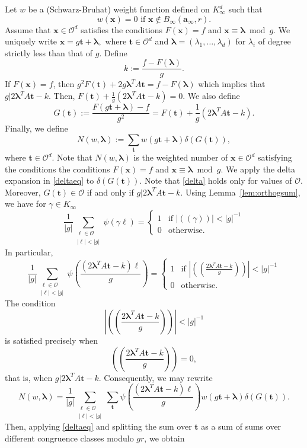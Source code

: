 \documentclass[11pt]{amsart}
\theoremstyle{plain}
\theoremstyle{plain}
\renewcommand{\vec}[1]{\mathbf{#1}}
\theoremstyle{remark}
\theoremstyle{definition}
\newcommand{\Ki}{K_\infty}
\newcommand{\cO}{\mathcal{O}}
\begin{document}
Let $w$ be a (Schwarz-Bruhat) weight function defined on $\Ki^d$ such that 
\begin{equation}\label{property1}  w(\vec{x})=0  \text{ if }   \vec{x}\notin B_{\infty}(\vec{a}_{\infty},r).\end{equation}
Assume that $\vec{x}\in \mathcal{O}^d$ satisfies the conditions $F(\vec{x})=f$ and $\vec{x}\equiv \boldsymbol{\lambda}\bmod g$. We uniquely write $\vec{x}=g\vec{t}+ \boldsymbol{\lambda},$ where $\vec{t}\in  \mathcal{O}^d$ and $\boldsymbol{\lambda}=(\lambda_1,\dots,\lambda_d)$ for $\lambda_i$ of degree strictly less than that of $g$. Define 
\begin{equation}\label{defk}
k:= \frac{f-F(\boldsymbol{\lambda})}{g}.
\end{equation}
If
$F(\vec{x}) =f$, then $g^2F(\vec{t})+2g\boldsymbol{\lambda}^T A\vec{t} =f-F(\boldsymbol{\lambda})$ which implies that $g|2\boldsymbol{\lambda}^TA\vec{t}-k.$ 
 Then, 
$F(\vec{t})+\frac{1}{g}(2\boldsymbol{\lambda}^T A\vec{t}-k )=0.$
We also define 
\[G(\vec{t}):=\frac{F(g\vec{t}+\boldsymbol{\lambda})-f}{g^2}=F(\vec{t})+\frac{1}{g}(2\boldsymbol{\lambda}^T A\vec{t}-k).\]
Finally, we  define $$N(w,\boldsymbol{\lambda}):=\sum_{\vec{t}} w(g\vec{t}+\boldsymbol{\lambda}) \delta{(G(\vec{t}))},$$  where $\vec{t}\in \mathcal{O}^{d}$. Note that $N(w,\boldsymbol{\lambda})$ is the weighted number of $\boldsymbol{x}\in\mathcal{O}^d$ satisfying the conditions the conditions $F(\vec{x})=f$ and $\vec{x}\equiv \boldsymbol{\lambda}\bmod g$. We apply the delta expansion in \eqref{deltaeq} to   $ \delta{(G(\vec{t}))}.$ Note that \eqref{delta} holds only for values of $\mathcal{O}$. Moreover,  $G(\vec{t})\in \mathcal{O}$ if and only if $g|2\boldsymbol{\lambda}^TA\vec{t}-k.$ Using Lemma~\ref{lem:orthogsum}, we have for $\gamma\in\Ki$
\[
\frac{1}{|g|}\sum_{\substack{\ell\in \cO\\ |\ell|<|g|}}\psi(\gamma \ell)=\begin{cases}1 & \mbox{if $|(\!(\gamma)\!)|<|g|^{-1}$}\\ 0 & \mbox{otherwise.}\end{cases}
\]
In particular,
\[
\frac{1}{|g|}\sum_{\substack{\ell\in \cO\\ |\ell|<|g|}}\psi\left(\frac{(2\boldsymbol{\lambda}^T A\vec{t}-k)\ell}{g}\right)=\begin{cases}1 & \mbox{if $|(\!(\frac{2\boldsymbol{\lambda}^T A\vec{t}-k}{g})\!)|<|g|^{-1}$}\\ 0 & \mbox{otherwise.}\end{cases}
\]
The condition 
\[\left|(\!(\frac{2\boldsymbol{\lambda}^T A\vec{t}-k}{g})\!)\right|<|g|^{-1}\]
is satisfied precisely when 
\[(\!(\frac{2\boldsymbol{\lambda}^T A\vec{t}-k}{g})\!)=0,\]
that is, when $g|2\boldsymbol{\lambda}^T A\vec{t}-k$. Consequently, we may rewrite
\begin{equation*}
N(w,\boldsymbol{\lambda})=\frac{1}{|g|}\sum_{\substack{\ell\in \cO\\ |\ell|<|g|}}\sum_{\vec{t}} \psi\left(\frac{(2\boldsymbol{\lambda}^T A\vec{t}-k)\ell}{g}\right)w(g\vec{t}+\boldsymbol{\lambda}) \delta{(G(\vec{t}))}.
\end{equation*}
Then, applying \eqref{deltaeq} and splitting the sum over $\vec{t}$ as a sum of sums over different congruence classes modulo $gr$, we obtain
\end{document}

